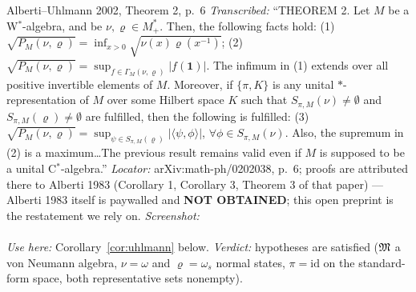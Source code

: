 \documentclass[11pt]{article}
\newcommand{\one}{\mathbf 1}
\begin{document}
\begin{citedbox}{Alberti--Uhlmann 2002, Theorem 2, p.~6}
\emph{Transcribed:} ``THEOREM 2. Let $M$ be a W$^*$-algebra, and be $\nu,\varrho\in M^*_+$. Then, the following facts
hold: (1) $\sqrt{P_M(\nu,\varrho)}=\inf_{x>0}\sqrt{\nu(x)\varrho(x^{-1})}$; (2)
$\sqrt{P_M(\nu,\varrho)}=\sup_{f\in\Gamma_M(\nu,\varrho)}|f(\one)|$.  The infimum in (1) extends over all positive
invertible elements of $M$.  Moreover, if $\{\pi,K\}$ is any unital $*$-representation of $M$ over some Hilbert space
$K$ such that $S_{\pi,M}(\nu)\ne\emptyset$ and $S_{\pi,M}(\varrho)\ne\emptyset$ are fulfilled, then the following is
fulfilled: (3) $\sqrt{P_M(\nu,\varrho)}=\sup_{\psi\in S_{\pi,M}(\varrho)}|\langle\psi,\phi\rangle|$,
$\forall\phi\in S_{\pi,M}(\nu)$.  Also, the supremum in (2) is a maximum\dots The previous result remains valid even
if $M$ is supposed to be a unital C$^*$-algebra.''
\emph{Locator:} arXiv:math-ph/0202038, p.~6; proofs are attributed there to Alberti 1983 (Corollary 1, Corollary 3,
Theorem 3 of that paper) --- Alberti 1983 itself is paywalled and \textbf{NOT OBTAINED}; this open preprint is the
restatement we rely on.
\emph{Screenshot:}\\
\\
\emph{Use here:} Corollary~\ref{cor:uhlmann} below.  \emph{Verdict:} hypotheses are satisfied ($\mathfrak M$ a von Neumann
algebra, $\nu=\omega$ and $\varrho=\omega_s$ normal states, $\pi=\mathrm{id}$ on the standard-form space, both
representative sets nonempty).
\end{citedbox}
\end{document}
